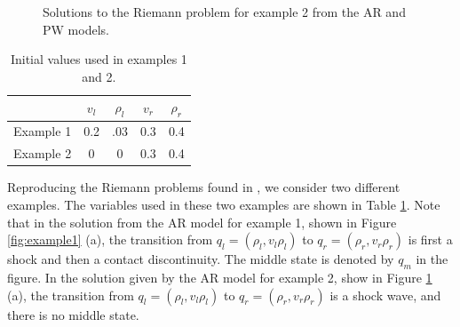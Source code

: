 \documentclass{article}
\begin{document}
\begin{figure}[h!]
 \centering
 \caption[Optional caption for list of figures]
 {Solutions to the Riemann problem for example 2 from the AR and PW models.}
  \label{fig:example2}
\end{figure}

\begin{table}[t]
\caption{Initial values used in examples 1 and 2.}
\begin{center}
\begin{tabular}{| c | c c  c c|}
\hline
& $v_l$ & $\rho_l $ & $v_r$ & $\rho_r $\\
\hline
Example 1 & 0.2 & .03 & 0.3 & 0.4 \\
Example 2 & 0 & 0 & 0.3 & 0.4\\
\hline
\end{tabular}
\end{center}
 \label{table:1}
\end{table}

Reproducing the Riemann problems found in \cite{AwRascle2000}, we consider two different examples. The variables used in these two examples are shown in Table \ref{table:1}. Note that in the solution from the AR model for example 1, shown in Figure \ref{fig:example1} (a), the transition from $q_l = (\rho_l, v_l\rho_l)$ to $q_r = (\rho_r, v_r\rho_r)$ is first a shock and then a contact discontinuity. The middle state is denoted by $q_m$ in the figure. In the solution given by the AR model for example 2, show in Figure \ref{fig:example2} (a), the transition from $q_l = (\rho_l, v_l\rho_l)$ to $q_r = (\rho_r, v_r\rho_r)$ is a shock wave, and there is no middle state.

{}

\end{document}
